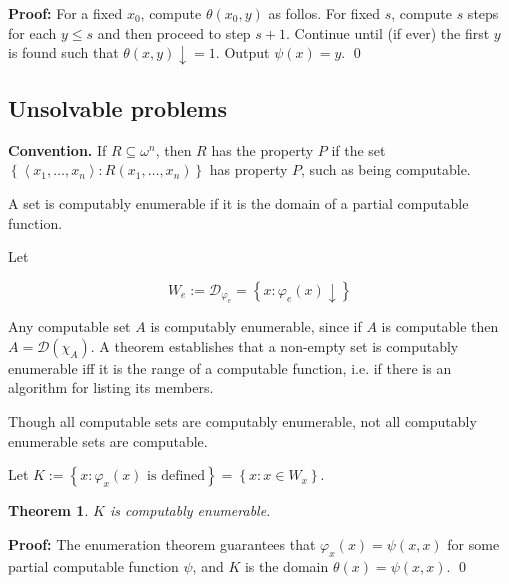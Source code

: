 \documentclass[a4paper, 12pt]{article}
\newtheorem{theorem}{Theorem}
\newtheorem{theorem}{Theorem}
\newenvironment{proof}[1][Proof]{\par\small\noindent\textbf{#1:} }{\qed\par\normalsize}
\begin{document}
\begin{proof}
    For a fixed $x_0$, compute $\theta(x_0, y)$ as follos. For fixed $s$,
    compute $s$ steps for each $y \leq s$ and then proceed to step 
    $s + 1$. Continue until (if ever) the first $y$ is found 
    such that $\theta(x, y)\downarrow = 1$. Output $\psi(x) = y$.
\end{proof}

\subsection{Unsolvable problems}

\textbf{Convention.} If $R \subseteq \omega^n$, then $R$ has 
the property $P$ if the set 
$\left\{ \left<x_1,\ldots,x_n \right> : R(x_1, \ldots, x_n)\right\} $ has 
property $P$, such as being computable.

\begin{definition}
    A set is computably enumerable if it is the domain of a partial computable function.
\end{definition}

Let 

\begin{equation*}
    W_e := \mathcal{D}_{\varphi_e} = \left\{ x : \varphi_e(x)\downarrow \right\} 
\end{equation*}

Any computable set $A$ is computably enumerable, since if $A$ is computable then 
$A = \mathcal{D}(\chi_A)$. A theorem establishes that a non-empty set is 
computably enumerable iff it is the range of a computable function, 
i.e. if there is an algorithm for listing its members. 

Though all computable sets are computably enumerable, not all computably 
enumerable sets are computable. 

\begin{definition}
    Let $K := \left\{ x : \varphi_x(x) \text{ is defined} \right\} = \left\{ x : x \in W_x \right\} $.
\end{definition}

\begin{theorem}
    $K$ is computably enumerable.
\end{theorem}

\begin{proof}
    The enumeration theorem guarantees that 
    $\varphi_x(x) = \psi(x, x)$ for some partial computable function $\psi$,
    and $K$ is the domain $\theta(x) = \psi(x, x)$.
\end{proof}
\end{document}
